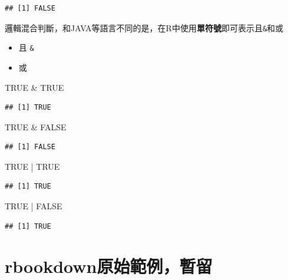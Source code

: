 \documentclass[]{book}
\newenvironment{Shaded}{\begin{snugshade}}{\end{snugshade}}
\newcommand{\StringTok}[1]{\textcolor[rgb]{0.31,0.60,0.02}{{#1}}}
\newcommand{\OtherTok}[1]{\textcolor[rgb]{0.56,0.35,0.01}{{#1}}}
\newcommand{\NormalTok}[1]{{#1}}
\providecommand{\tightlist}{%
  \setlength{\itemsep}{0pt}\setlength{\parskip}{0pt}}
\theoremstyle{definition}
\theoremstyle{definition}
\theoremstyle{remark}
\begin{document}
\begin{verbatim}
## [1] FALSE
\end{verbatim}

邏輯混合判斷，和JAVA等語言不同的是，在R中使用\textbf{單符號}即可表示且\texttt{\&}和或\texttt{\textbar{}}

\begin{itemize}
\tightlist
\item
  且 \texttt{\&}
\item
  或 \texttt{\textbar{}}
\end{itemize}

\begin{Shaded}
\begin{Highlighting}[]
\OtherTok{TRUE} \NormalTok{&}\StringTok{ }\OtherTok{TRUE}
\end{Highlighting}
\end{Shaded}

\begin{verbatim}
## [1] TRUE
\end{verbatim}

\begin{Shaded}
\begin{Highlighting}[]
\OtherTok{TRUE} \NormalTok{&}\StringTok{ }\OtherTok{FALSE}
\end{Highlighting}
\end{Shaded}

\begin{verbatim}
## [1] FALSE
\end{verbatim}

\begin{Shaded}
\begin{Highlighting}[]
\OtherTok{TRUE} \NormalTok{|}\StringTok{ }\OtherTok{TRUE}
\end{Highlighting}
\end{Shaded}

\begin{verbatim}
## [1] TRUE
\end{verbatim}

\begin{Shaded}
\begin{Highlighting}[]
\OtherTok{TRUE} \NormalTok{|}\StringTok{ }\OtherTok{FALSE}
\end{Highlighting}
\end{Shaded}

\begin{verbatim}
## [1] TRUE
\end{verbatim}

\section{rbookdown原始範例，暫留}\label{rbookdown}
\end{document}

